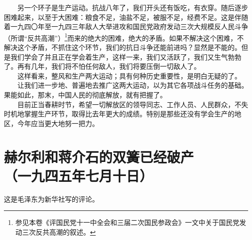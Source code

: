 \documentclass[cn,11pt,chinese]{elegantbook}
\def\myformat#1{\hfil\hfil #1}
\begin{document}
　　另一个环子是生产运动。抗战八年了，我们开头还有饭吃，有衣穿。随后逐步困难起来，以至于大困难：粮食不足，油盐不足，被服不足，经费不足。这是伴随着一九四〇年至一九四三年敌人大举进攻和国民党政府发动三次大规模反人民斗争（所谓“反共高潮”）\footnote[1]{ 参见本卷《评国民党十一中全会和三届二次国民参政会》一文中关于国民党发动三次反共高潮的叙述。}而来的绝大的困难，绝大的矛盾。如果不解决这个困难，不解决这个矛盾，不抓住这个环节，我们的抗日斗争还能前进吗？显然是不能的。但是我们学会了并且正在学会着生产，这样一来，我们又活跃了，我们又生气勃勃了。再有几年，我们将不怕任何敌人，我们将要压倒一切敌人了。\\
　　这样看来，整风和生产两大运动；具有何种历史重要性，是明白无疑的了。\\
　　让我们进一步地、普遍地去推广这两大运动，以为其它各项战斗任务的基础。果能如此，那末，中国人民的彻底解放，就有把握了。\\
　　目前正当春耕时节，希望一切解放区的领导同志、工作人员、人民群众，不失时机地掌握生产环节，取得比去年更大的成绩。特别是那些还没有学会生产的地区，今年应当更大地努一把力。\\
\newpage\section*{\myformat{赫尔利和蒋介石的双簧已经破产}\\\myformat{（一九四五年七月十日）}}
\begin{introduction}\item  这是毛泽东为新华社写的评论。\end{introduction}
\end{document}
